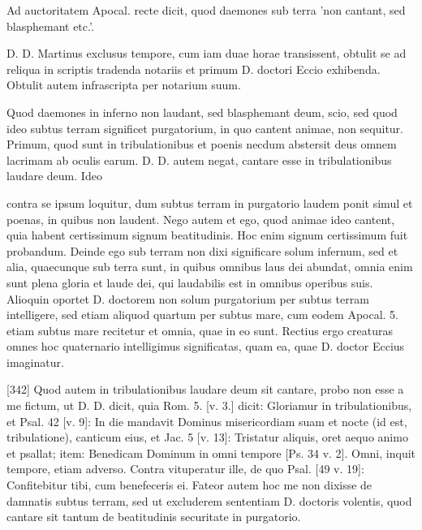 Ad auctoritatem Apocal. recte dicit, quod daemones sub terra 'non cantant, sed blasphemant etc.'.

D. D. Martinus exclusus tempore, cum iam duae horae transissent, obtulit se ad reliqua in scriptis tradenda notariis et primum D. doctori Eccio exhibenda. Obtulit autem infrascripta per notarium suum.

Quod daemones in inferno non laudant, sed blasphemant deum, scio, sed quod ideo subtus terram significet purgatorium, in quo cantent animae, non sequitur. Primum, quod sunt in tribulationibus et poenis necdum abstersit deus omnem lacrimam ab oculis earum. D. D. autem negat, cantare esse in tribulationibus laudare deum. Ideo

contra se ipsum loquitur, dum subtus terram in purgatorio laudem ponit simul et poenas, in quibus non laudent. Nego autem et ego, quod animae ideo cantent, quia habent certissimum signum beatitudinis. Hoc enim signum certissimum fuit probandum. Deinde ego sub terram non dixi significare solum infernum, sed et alia, quaecunque sub terra sunt, in quibus omnibus laus dei abundat, omnia enim sunt plena gloria et laude dei, qui laudabilis est in omnibus operibus suis. Alioquin oportet D. doctorem non solum purgatorium per subtus terram intelligere, sed etiam aliquod quartum per subtus mare, cum eodem Apocal. 5. etiam subtus mare recitetur et omnia, quae in eo sunt. Rectius ergo creaturas omnes hoc quaternario intelligimus significatas, quam ea, quae D. doctor Eccius imaginatur.

[342] Quod autem in tribulationibus laudare deum sit cantare, probo non esse a me fictum, ut D. D. dicit, quia Rom. 5. [v. 3.] dicit: Gloriamur in tribulationibus, et Psal. 42 [v. 9]: In die mandavit Dominus misericordiam suam et nocte (id est, tribulatione), canticum eius, et Jac. 5 [v. 13]: Tristatur aliquis, oret aequo animo et psallat; item: Benedicam Dominum in omni tempore [Ps. 34 v. 2]. Omni, inquit tempore, etiam adverso. Contra vituperatur ille, de quo Psal. [49 v. 19]: Confitebitur tibi, cum benefeceris ei. Fateor autem hoc me non dixisse de damnatis subtus terram, sed ut excluderem sententiam D. doctoris volentis, quod cantare sit tantum de beatitudinis securitate in purgatorio.

